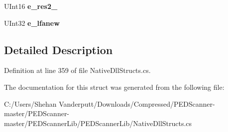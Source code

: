 \begin{DoxyCompactItemize}
\mbox{\label{struct_p_e_d_scanner_lib_1_1_struct_1_1_pe_header_reader_1_1_i_m_a_g_e___d_o_s___h_e_a_d_e_r_a6a812669202cfa3cfb3229fe8a13f1eb}} 
U\+Int16 {\bfseries e\+\_\+res2\+\_}
\item 
\mbox{\label{struct_p_e_d_scanner_lib_1_1_struct_1_1_pe_header_reader_1_1_i_m_a_g_e___d_o_s___h_e_a_d_e_r_a5d2de752b108e5ca77ba4ee79ba7f5b5}} 
U\+Int32 {\bfseries e\+\_\+lfanew}
\end{DoxyCompactItemize}


\subsection{Detailed Description}


Definition at line 359 of file Native\+Dll\+Structs.\+cs.



The documentation for this struct was generated from the following file\+:\begin{DoxyCompactItemize}
\item 
C\+:/\+Users/\+Shehan Vanderputt/\+Downloads/\+Compressed/\+P\+E\+D\+Scanner-\/master/\+P\+E\+D\+Scanner-\/master/\+P\+E\+D\+Scanner\+Lib/\+P\+E\+D\+Scanner\+Lib/Native\+Dll\+Structs.\+cs\end{DoxyCompactItemize}
